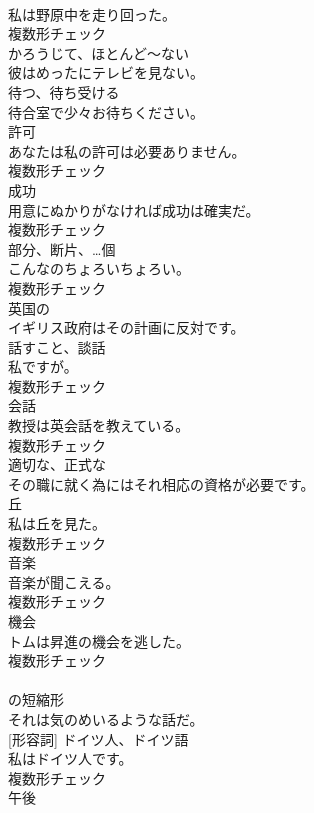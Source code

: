 \documentclass[8pt]{extreport}
\begin{document}
\begin{CJK}{UTF8}{min}
\\	私は野原中を走り回った。	
\\	複数形チェック
\\	[副詞]	かろうじて、ほとんど〜ない	
\\	彼はめったにテレビを見ない。	
\\	[動詞]	待つ、待ち受ける	
\\	待合室で少々お待ちください。	
\\	[名詞]	許可	
\\	あなたは私の許可は必要ありません。	
\\	複数形チェック
\\	[名詞]	成功	
\\	用意にぬかりがなければ成功は確実だ。	
\\	複数形チェック
\\	[名詞]	部分、断片、…個	
\\	こんなのちょろいちょろい。	
\\	複数形チェック
\\	[形容詞]	英国の	
\\	イギリス政府はその計画に反対です。	
\\	[名詞]	話すこと、談話	
\\	私ですが。	
\\	複数形チェック
\\	[名詞]	会話	
\\	教授は英会話を教えている。	
\\	複数形チェック
\\	[形容詞]	適切な、正式な	
\\	その職に就く為にはそれ相応の資格が必要です。	
\\	[名詞]	丘	
\\	私は丘を見た。	
\\	複数形チェック
\\	[名詞]	音楽	
\\	音楽が聞こえる。	
\\	複数形チェック
\\	[名詞]	機会	
\\	トムは昇進の機会を逃した。	
\\	複数形チェック
\\	[短縮形]	
\\	の短縮形	
\\	それは気のめいるような話だ。	
\\	[名詞] [形容詞]	ドイツ人、ドイツ語	
\\	私はドイツ人です。	
\\	複数形チェック
\\	[名詞]	午後	

\end{CJK}
\end{document}
